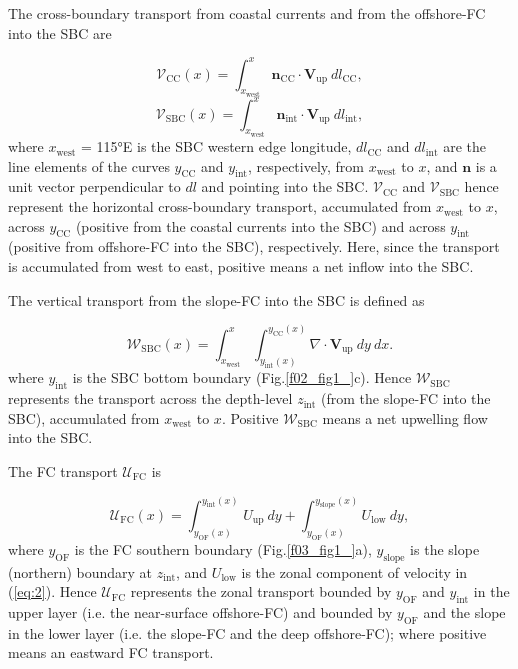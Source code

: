 \documentclass[preprint,3p,review,12pt]{elsarticle}
\renewcommand{\Vec}[1]{\mathbf{#1}}
\newcommand{\sub}[1]{_{\text{#1}}}
\begin{document}
The cross-boundary transport from coastal currents and from the offshore-FC into the SBC are 

\begin{equation} \label{eq:4}
\mathcal{V}\sub{CC}(x) = \int_{x\sub{west}}^{x}\Vec{n}\sub{CC}\cdot\Vec{V}\sub{up}\ dl\sub{CC},
\end{equation}
%
\begin{equation} \label{eq:5}
\mathcal{V}\sub{SBC}(x) = \int_{x\sub{west}}^{x}\Vec{n}\sub{int}\cdot\Vec{V}\sub{up}\ dl\sub{int},
\end{equation}
%
where $x\sub{west}$ = \ang{115}E is the SBC western edge longitude, $dl\sub{CC}$ and $dl\sub{int}$ are the line elements of the curves $y\sub{CC}$ and $y\sub{int}$, respectively, from $x\sub{west}$ to $x$, and $\Vec{n}$ is a unit vector perpendicular to $dl$ and pointing into the SBC\@.
$\mathcal{V}\sub{CC}$ and $\mathcal{V}\sub{SBC}$ hence represent the horizontal cross-boundary transport, accumulated from $x\sub{west}$ to $x$, across $y\sub{CC}$ (positive from the coastal currents into the SBC) and across $y\sub{int}$ (positive from offshore-FC into the SBC), respectively. Here, since the transport is accumulated from west to east, positive means a net inflow into the SBC.

The vertical transport from the slope-FC into the SBC is defined as

\begin{equation} \label{eq:6}
\mathcal{W}\sub{SBC}(x)
= \int_{x\sub{west}}^{x} \int_{y\sub{int}(x)}^{y\sub{CC}(x)} \nabla\cdot\Vec{V}\sub{up}\ dy\ dx.
\end{equation}
%
where $y\sub{int}$ is the SBC bottom boundary (Fig.\ref{f02_fig1_}c). Hence $\mathcal{W}\sub{SBC}$ represents the transport across the depth-level $z\sub{int}$ (from the slope-FC into the SBC), accumulated from $x\sub{west}$ to $x$. Positive $\mathcal{W}\sub{SBC}$ means a net upwelling flow into the SBC.

The FC transport $\mathcal{U}\sub{FC}$ is 

\begin{equation} \label{eq:7}
\mathcal{U}\sub{FC}(x) = \int_{y\sub{OF}(x)}^{y\sub{int}(x)}{U}\sub{up}\ dy
+ \int_{y\sub{OF}(x)}^{y\sub{slope}(x)}{U}\sub{low}\ dy,
\end{equation}
%
where $y\sub{OF}$ is the FC southern boundary (Fig.\ref{f03_fig1_}a), $y\sub{slope}$ is the slope (northern) boundary at $z\sub{int}$, and $U\sub{low}$ is the zonal component of velocity in (\ref{eq:2}). Hence $\mathcal{U}\sub{FC}$ represents the zonal transport bounded by $y\sub{OF}$ and $y\sub{int}$ in the upper layer (i.e. the near-surface offshore-FC) and bounded by $y\sub{OF}$ and the slope in the lower layer (i.e. the slope-FC and the deep offshore-FC); where positive means an eastward FC transport.
\end{document}
